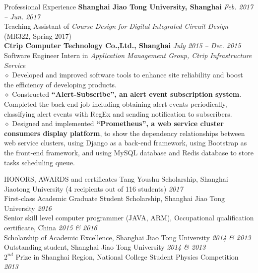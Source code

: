 \documentclass{resume} %
\begin{document}
\begin{rSection}{Professional Experience}
\textbf{Shanghai Jiao Tong University, Shanghai} \hfill \emph{Feb. 2017 -- Jun. 2017}
\\Teaching Assistant of \emph{Course Design for Digital Integrated Circuit Design} (MR322, Spring 2017)
\\\textbf{Ctrip Computer Technology Co.,Ltd., Shanghai} \hfill \emph{July 2015 -- Dec. 2015}
\\Software Engineer Intern in \emph{Application Management Group, Ctrip Infrastructure Service}
\\$\diamond$ Developed and improved software tools to enhance site reliability and boost the efficiency of developing  products.
\\$\diamond$ Constructed \textbf{``Alert-Subscribe'', an alert event subscription system}. Completed the back-end job including obtaining alert events periodically, classifying alert events with RegEx and sending notification to subscribers.
\\$\diamond$ Designed and implemented \textbf{``Prometheus'', a web service cluster consumers display platform}, to show the dependency relationships between web service clusters, using Django as a back-end framework, using Bootstrap as the front-end framework, and using MySQL database and Redis database to store tasks scheduling queue.
\end{rSection}

\begin{rSection}{HONORS, AWARDS and certificates}
Tang Youshu Scholarship, Shanghai Jiaotong University (4 recipients out of 116 students) \hfill \emph{2017}
\\First-class Academic Graduate Student Scholarship, Shanghai Jiao Tong University  \hfill \emph{2016}
\\Senior skill level computer programmer (JAVA, ARM), Occupational qualification certificate, China \hfill \emph{2015 \& 2016}
\\Scholarship of Academic Excellence, Shanghai Jiao Tong University \hfill \emph{2014 \& 2013}
\\Outstanding student, Shanghai Jiao Tong University \hfill \emph{2014 \& 2013}
\\$2^{nd}$ Prize in Shanghai Region, National College Student Physics Competition \hfill \emph{2013}
\end{rSection}





\end{document}
